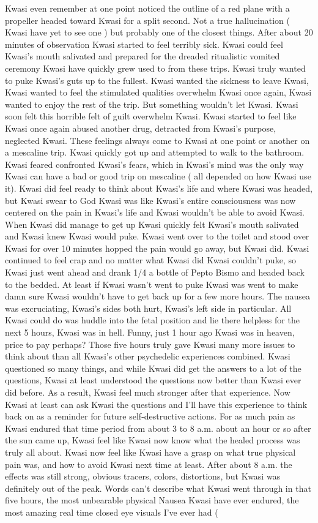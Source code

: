 \documentclass[12pt]{book}
\begin{document}
Kwasi even remember at one point noticed the outline of a red plane with a propeller headed toward Kwasi for a split second. Not a true hallucination ( Kwasi have yet to see one ) but probably one of the closest things. After about 20 minutes of observation Kwasi started to feel terribly sick. Kwasi could feel Kwasi's mouth salivated and prepared for the dreaded ritualistic vomited ceremony Kwasi have quickly grew used to from these trips. Kwasi truly wanted to puke Kwasi's guts up to the fullest. Kwasi wanted the sickness to leave Kwasi, Kwasi wanted to feel the stimulated qualities overwhelm Kwasi once again, Kwasi wanted to enjoy the rest of the trip. But something wouldn't let Kwasi. Kwasi soon felt this horrible felt of guilt overwhelm Kwasi. Kwasi started to feel like Kwasi once again abused another drug, detracted from Kwasi's purpose, neglected Kwasi. These feelings always come to Kwasi at one point or another on a mescaline trip. Kwasi quickly got up and attempted to walk to the bathroom. Kwasi feared confronted Kwasi's fears, which in Kwasi's mind was the only way Kwasi can have a bad or good trip on mescaline ( all depended on how Kwasi use it). Kwasi did feel ready to think about Kwasi's life and where Kwasi was headed, but Kwasi swear to God Kwasi was like Kwasi's entire consciousness was now centered on the pain in Kwasi's life and Kwasi wouldn't be able to avoid Kwasi. When Kwasi did manage to get up Kwasi quickly felt Kwasi's mouth salivated and Kwasi knew Kwasi would puke. Kwasi went over to the toilet and stood over Kwasi for over 10 minutes hopped the pain would go away, but Kwasi did. Kwasi continued to feel crap and no matter what Kwasi did Kwasi couldn't puke, so Kwasi just went ahead and drank 1/4 a bottle of Pepto Bismo and headed back to the bedded. At least if Kwasi wasn't went to puke Kwasi was went to make damn sure Kwasi wouldn't have to get back up for a few more hours. The nausea was excruciating, Kwasi's sides both hurt, Kwasi's left side in particular. All Kwasi could do was huddle into the fetal position and lie there helpless for the next 5 hours, Kwasi was in hell. Funny, just 1 hour ago Kwasi was in heaven, price to pay perhaps? Those five hours truly gave Kwasi many more issues to think about than all Kwasi's other psychedelic experiences combined. Kwasi questioned so many things, and while Kwasi did get the answers to a lot of the questions, Kwasi at least understood the questions now better than Kwasi ever did before. As a result, Kwasi feel much stronger after that experience. Now Kwasi at least can ask Kwasi the questions and I'll have this experience to think back on as a reminder for future self-destructive actions. For as much pain as Kwasi endured that time period from about 3 to 8 a.m. about an hour or so after the sun came up, Kwasi feel like Kwasi now know what the healed process was truly all about. Kwasi now feel like Kwasi have a grasp on what true physical pain was, and how to avoid Kwasi next time at least. After about 8 a.m. the effects was still strong, obvious tracers, colors, distortions, but Kwasi was definitely out of the peak. Words can't describe what Kwasi went through in that five hours, the most unbearable physical Nausea Kwasi have ever endured, the most amazing real time closed eye visuals I've ever had ( 
\end{document}
